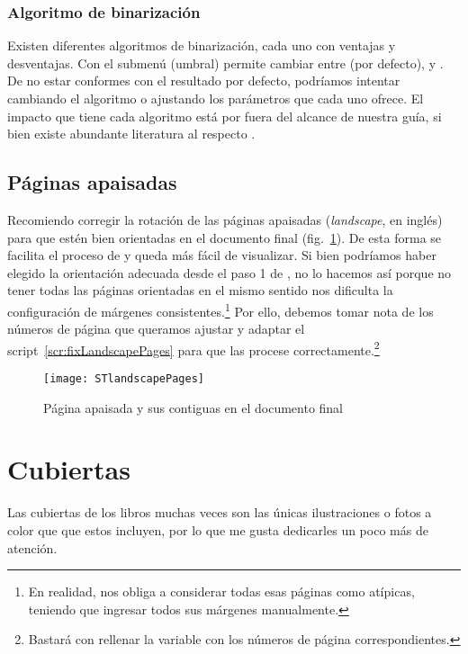 \documentclass[%
	a5paper,
	10pt,
	twoside,
	openright,
	final,
]{memoir}
\begin{document}
{	\subsubsection{Algoritmo de binarización} Existen diferentes algoritmos de binarización, cada uno con ventajas y desventajas. Con el submenú  (umbral) \scantailorAdvanced permite cambiar entre  (por defecto),  y . De no estar conformes con el resultado por defecto, podríamos intentar cambiando el algoritmo o ajustando los parámetros que cada uno ofrece. El impacto que tiene cada algoritmo está por fuera del alcance de nuestra guía, si bien existe abundante literatura al respecto \cite{RashmiBinarization}.

	\subsection{Páginas apaisadas\label{sec:landscapePages}} Recomiendo corregir la rotación de las páginas apaisadas (\emph{landscape}, en inglés) para que estén bien orientadas en el documento final (fig.~\ref{fig:STlandscapePages}). De esta forma se facilita el proceso de \ocr y queda más fácil de visualizar. Si bien podríamos haber elegido la orientación adecuada desde el paso 1 de \scantailor, no lo hacemos así porque no tener todas las páginas orientadas en el mismo sentido nos dificulta la configuración de márgenes consistentes.\footnote{En realidad, nos obliga a considerar todas esas páginas como atípicas, teniendo que ingresar todos sus márgenes manualmente.} Por ello, debemos tomar nota de los números de página que queramos ajustar y adaptar el script~\ref{scr:fixLandscapePages} para que las procese correctamente.\footnote{Bastará con rellenar la variable  con los números de página correspondientes.}

	\begin{figure}
		\texttt{[image: STlandscapePages]}
		\caption{Página apaisada y sus contiguas en el documento final\label{fig:STlandscapePages}}
	\end{figure}



	\section{Cubiertas\label{sec:covers}} Las cubiertas de los libros muchas veces son las únicas ilustraciones o fotos a color que que estos incluyen, por lo que me gusta dedicarles un poco más de atención.

}
\end{document}

